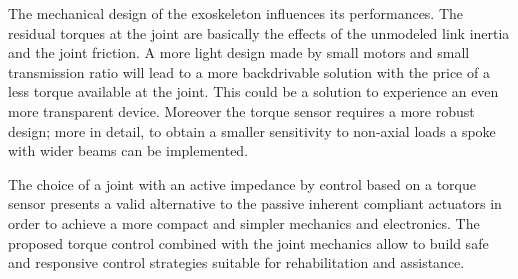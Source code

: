 \par The mechanical design of the exoskeleton influences its performances. The residual torques at the joint are basically the effects of the unmodeled link inertia and the joint friction. A more light design made by small motors and small transmission ratio will lead to a more backdrivable solution with the price of a less torque available at the joint. This could be a solution to experience an even more transparent device. Moreover the torque sensor requires a more robust design; more in detail, to obtain a smaller sensitivity to non-axial loads a spoke with wider beams can be implemented.
\par The choice of a joint with an active impedance by control based on a torque sensor presents a valid alternative to the passive inherent compliant actuators in order to achieve a more compact and simpler mechanics and electronics. The proposed torque control combined with the joint mechanics allow to build safe and responsive control strategies suitable for rehabilitation and assistance. 
